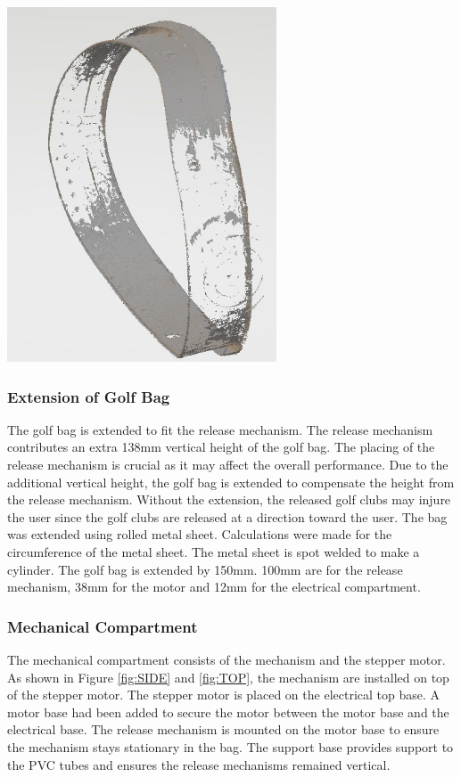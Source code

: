 \documentclass[11pt,landscape]{article}
\newenvironment{Figure}
  {\par\medskip\noindent\minipage{\linewidth}}
  {\endminipage\par\medskip}
\begin{document}
\begin{multicols}{3}
    \begin{Figure}
        \begin{center}
            \includegraphics[width=0.6\textwidth]{Figure.jpg}
            \label{fig:CAD}
        \end{center}
    \end{Figure}
    
    
    \subsubsection{Extension of Golf Bag}
    The golf bag is extended to fit the release mechanism. The release mechanism
    contributes an extra 138mm vertical height of the golf bag. The placing of the
    release mechanism is crucial as it may affect the overall performance. Due
    to the additional vertical height, the golf bag is extended to compensate
    the height from the release mechanism. Without the extension, the released
    golf clubs may injure the user since the golf clubs are released at a
    direction toward the user. The bag was extended using rolled metal
    sheet. Calculations were made for the circumference of the metal sheet.
    The metal sheet is spot welded to make a cylinder. The golf bag is
    extended by 150mm. 100mm are for the release mechanism, 38mm for the motor
    and 12mm for the electrical compartment.
    
    \subsubsection{Mechanical Compartment}
    The mechanical compartment consists of the mechanism and the stepper motor.
    As shown in Figure \ref{fig:SIDE} and \ref{fig:TOP}, the mechanism are
    installed on top of the stepper motor. The stepper motor is placed on the
    electrical top base. A motor base had been added to secure the motor between
    the motor base and the electrical base. The release mechanism is mounted on
    the motor base to ensure the mechanism stays stationary in the bag. The
    support base provides support to the PVC tubes and ensures the release
    mechanisms remained vertical.
    

\end{multicols}
\end{document}

